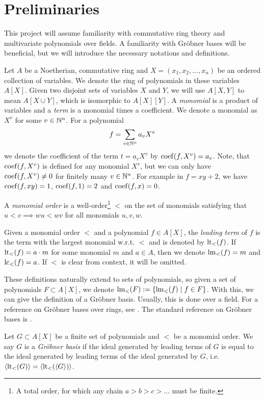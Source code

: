 \section{Preliminaries}
This project will assume familiarity with commutative ring theory and multivariate polynomials over fields. A familiarity with Gröbner bases will be beneficial, but we will introduce the necessary notations and definitions.

Let $A$ be a Noetherian, commutative ring and $X = (x_{1}, x_{2}, \dots, x_{n})$ be an ordered collection of variables. We denote the ring of polynomials in these variables $A[X]$. Given two disjoint sets of variables $X$ and $Y$, we will use $A[X, Y]$ to mean $A[X \cup Y]$, which is isomorphic to $A[X][Y]$. A \textit{monomial} is a product of variables and a \textit{term} is a monomial times a coefficient. We denote a monomial as $X^{v}$ for some $v \in \mathbb{N}^{n}$. For a polynomial \[f = \sum_{v \in \mathbb{N}^{n}} a_{v}X^{v}\] we denote the coefficient of the term $t = a_{v}X^{v}$ by $\operatorname{coef}(f, X^{v}) = a_{v}$. Note, that $\operatorname{coef}(f, X^{v})$ is defined for any monomial $X^{v}$, but we can only have $\operatorname{coef}(f, X^{v}) \neq 0$ for finitely many $v \in \mathbb{N}^{n}$. For example in $f = xy + 2$, we have $\operatorname{coef}(f, xy) = 1$, $\operatorname{coef}(f, 1) = 2$ and $\operatorname{coef}(f, x) = 0$.

\begin{definition}
  A \textit{monomial order} is a well-order\footnote{A total order, for which any chain $a > b > c > \dots$ must be finite.} $<$ on the set of monomials satisfying that $u < v \implies wu < wv$ for all monomials $u, v, w$.

  Given a monomial order $<$ and a polynomial $f \in A[X]$, the \textit{leading term} of $f$ is the term with the largest monomial w.r.t. $<$ and is denoted by $\operatorname{lt}_{<}(f)$. If $\operatorname{lt}_{<}(f) = a\cdot m$ for some monomial $m$ and $a \in A$, then we denote $\operatorname{lm}_{<}(f) = m$ and $\operatorname{lc}_{<}(f) = a$. If $<$ is clear from context, it will be omitted.
\end{definition}

These definitions naturally extend to sets of polynomials, so given a set of polynomials $F \subset A[X]$, we denote $\operatorname{lm}_{<}(F) := \{\operatorname{lm}_{<}(f) \mid f \in F\}$. With this, we can give the definition of a Gröbner basis. Usually, this is done over a field. For a reference on Gröbner bases over rings, see \cite{loustaunau1994introduction}. The standard reference on Gröbner bases is \cite{IVA}.

\begin{definition}
  Let $G \subset A[X]$ be a finite set of polynomials and $<$ be a monomial order. We say $G$ is a \textit{Gröbner basis} if the ideal generated by leading terms of $G$ is equal to the ideal generated by leading terms of the ideal generated by $G$, i.e.
  $\langle \operatorname{lt}_{<}(G) \rangle = \langle \operatorname{lt}_{<}(\langle G \rangle) \rangle$.
\end{definition}

